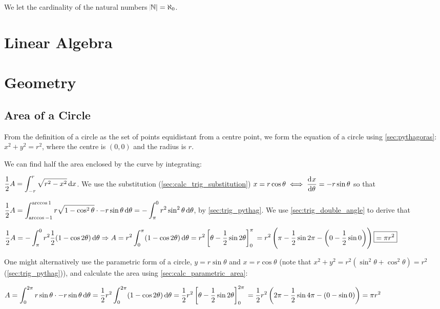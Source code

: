 \documentclass[a4paper,11pt]{article}
\begin{document}
    We let the cardinality of the natural numbers $\abs{\mathbb{N}} = \aleph_0$.

    \section{Linear Algebra}

    \section{Geometry}

    \subsection{Area of a Circle}


    From the definition of a circle as the set of points equidistant from a
    centre point, we form the equation of a circle using \ref{sec:pythagoras}:
    $x^2 + y^2 = r^2$, where the centre is $(0, 0)$ and the radius is $r$.

    We can find half the area enclosed by the curve by integrating:

    $\displaystyle \frac 12 A = \int_{-r}^r \sqrt{r^2 - x^2} \dif x$. We use the
    substitution (\ref{sec:calc_trig_substitution})
    $x = r \cos \theta \iff \dod x\theta = -r \sin \theta$ so that

    $\displaystyle \frac 12 A = \int_{\arccos -1}^{\arccos 1}
        r\sqrt{1 - \cos^2 \theta} \cdot -r \sin \theta \dif \theta
      = -\int_\pi^0 r^2 \sin^2 \theta \dif \theta$, by \ref{sec:trig_pythag}. We
      use \ref{sec:trig_double_angle} to derive that

    $\displaystyle \frac 12 A = -\int_\pi^0
        r^2 \frac 12 (1 - \cos 2 \theta) \dif \theta \Rightarrow
     A = r^2 \int_0^\pi (1 - \cos 2 \theta) \dif \theta =
     r^2\left[\theta - \frac 12 \sin 2 \theta \right]_0^\pi
     \\= r^2 \left(\pi - \frac 12 \sin 2 \pi -
                   \left(0 - \frac 12 \sin 0\right)\right) \boxed{= \pi r^2}$

    One might alternatively use the parametric form of a circle,
    $y = r \sin \theta$ and $x = r \cos \theta$
    (note that $x^2 + y^2 = r^2(\sin^2 \theta + \cos^2 \theta) = r^2$
    (\ref{sec:trig_pythag})), and calculate the area using
    \ref{sec:calc_parametric_area}:

    $\displaystyle A = \int_0^{2\pi}
        r \sin \theta \cdot -r \sin \theta \dif \theta =
     \frac 12 r^2 \int_0^{2\pi} (1 - \cos 2 \theta) \dif \theta =
     \frac 12 r^2 \left[\theta - \frac 12 \sin 2 \theta\right]_0^{2\pi}
     \\= \frac 12 r^2 \left(2\pi - \frac 12 \sin 4 \pi -
                      \left(0 - \sin 0\right)\right) = \pi r^2$
\end{document}
